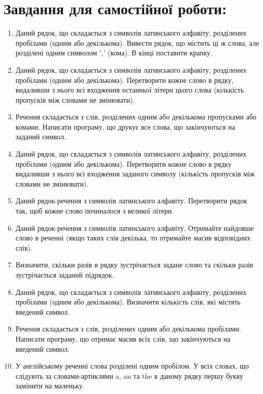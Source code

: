 \documentclass[a5paper,titlepage,openany,twoside,draft]{book_unv}%
\begin{document}
\section{Завдання для самостійної роботи:}

\begin{enumerate}
\def\labelenumi{\arabic{enumi})}
\setcounter{enumi}{6}
\item
  Даний рядок, що складається з символів латинського алфавіту,
  розділених пробілами (одним або декількома). Вивести рядок, що містить
  ці ж слова, але розділені одним символом ',' (кома). В кінці
  поставити крапку.
\item
  Даний рядок, що складається з символів латинського алфавіту,
  розділених пробілами (одним або декількома). Перетворити кожне слово в
  рядку, видаливши з нього всі входження останньої літери цього слова
  (кількість пропусків між словами не змінювати).
\item
  Речення складається з слів, розділених одним або декількома
  пропусками або комами. Написати програму, що друкує все слова, що закінчуються на
  заданий символ.
\item
  Даний рядок, що складається з символів латинського алфавіту,
  розділених пробілами (одним або декількома). Перетворити кожне слово в
  рядку видаливши з нього всі входження заданого символу (кількість
  пропусків між словами не змінювати).
\item
  Даний рядок-речення з символів латинського алфавіту. Перетворити рядок
  так, щоб кожне слово починалося з великої літери.
\item
  Даний рядок-речення з символів латинського алфавіту. Отримайте найдовше
  слово в реченні (якщо таких слів декілька, то отримайте масив відповідних слів).
\item
  Визначити, скільки разів в рядку зустрічається задане слово та скільки разів 
зустрічається заданий підрядок.
\item
  Даний рядок, що складається з символів латинського алфавіту,
  розділених пробілами (одним або декількома). Визначити кількість слів,
  які містять введений символ.
\item
  Речення складається з слів, розділених одним або декількома
  пробілами. Написати програму, що отримає масив всіх слів, що закінчуються на
  введений символ.
\item
  У англійському реченні слова розділені одним пробілом. У всіх словах, що 
слідують за словами-артиклями a, an та the в даному рядку першу букву замінити на маленьку.


\end{enumerate}
\end{document}
